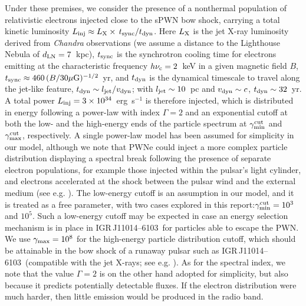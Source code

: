 \documentclass[letter]{aa}
\newcommand{\igr}{IGR\,J11014--6103~}
\begin{document}
Under these premises, we consider the presence of a nonthermal population of relativistic electrons injected close to the sPWN bow shock, carrying a total kinetic luminosity $L_{\rm inj} \approx L_{\rm X} \times \, t_{\rm sync}/t_{\rm dyn}$. Here $L_{\rm X}$ is the jet X-ray luminosity derived from \textit{Chandra} observations (we assume a distance to the Lighthouse Nebula of $d_{\rm LN} = 7$~kpc), $t_{\rm sync}$ is the synchrotron cooling time for electrons emitting at the characteristic frequency $h\nu_{\rm c} = 2$~keV in a given magnetic field $B$, $t_{\rm sync} \approx 460\,(B/30 \rm{ \mu G})^{-1/2}$~yr, and $t_{\rm dyn}$ is the dynamical timescale to travel along the jet-like feature, $t_{\rm dyn} \sim l_{\rm jet}/v_{\rm dyn}$; with $l_{\rm jet} \sim 10$~pc and $v_{\rm dyn} \sim c$, $t_{\rm dyn} \sim 32$~yr. A total power $L_{\rm inj} = 3 \times 10^{34}$~erg~s$^{-1}$ is therefore injected, which is distributed in energy following a power-law with index $\Gamma = 2$ and an exponential cutoff at both the low- and the high-energy ends of the particle spectrum at $\gamma_{\rm min}^{\rm cut}$ and $\gamma_{\rm max}^{\rm cut}$, respectively. A single power-law model has been assumed for simplicity in our model, although we note that PWNe could inject a more complex particle distribution displaying a spectral break following the presence of separate electron populations, for example those injected within the pulsar's light cylinder, and electrons accelerated at the shock between the pulsar wind and the external medium (see e.g. \citealp{Atoyan1996, Venter2007, Torres2014}). The low-energy cutoff is an assumption in our model, and it is treated as a free parameter, with two cases explored in this report:$\gamma_{\rm min}^{ \rm cut} = 10^3$ and $10^{5}$. Such a low-energy cutoff may be expected in case an energy selection mechanism is in place in \igr for particles able to escape the PWN. We use $\gamma_{\rm max} = 10^{8}$ for the high-energy particle distribution cutoff, which should be attainable in the bow shock of a runaway pulsar such as \igr (compatible with the jet X-rays; see e.g. \citealp{Bykov2017}). As for the spectral index, we note that the value $\Gamma = 2$ is on the other hand adopted for simplicity, but also because it predicts potentially detectable fluxes. If the electron distribution were much harder, then little emission would be produced in the radio band. 


\end{document}
